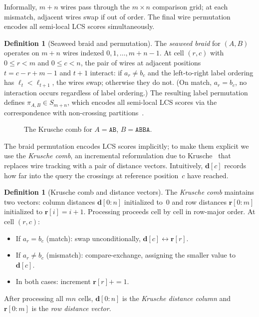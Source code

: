\documentclass[11pt, a4paper]{article}
\theoremstyle{definition}
\newtheorem{definition}[theorem]{Definition}
\theoremstyle{remark}
\newcommand{\dcol}{\mathbf{d}}
\newcommand{\drow}{\mathbf{r}}
\newcommand{\perm}{\pi}
\begin{document}
Informally, $m{+}n$ wires pass through the $m \times n$ comparison
grid; at each mismatch, adjacent wires swap if out of order.
The
final wire permutation encodes all semi-local LCS scores
simultaneously.

\begin{definition}[Seaweed braid and permutation]
\label{def:seaweed}
The \emph{seaweed braid} for $(A, B)$ operates on
$m{+}n$ wires indexed $0, 1, \dots, m{+}n{-}1$.
At cell
$(r, c)$ with $0 \le r < m$ and $0 \le c < n$, the pair of
wires at adjacent positions $t = c - r + m - 1$ and $t{+}1$
interact: if $a_r \ne b_c$ and the left-to-right label ordering
has $\ell_t < \ell_{t+1}$, the wires swap;
otherwise they do
not.  (On match, $a_r = b_c$, no interaction occurs regardless of
label ordering.)  The resulting label permutation defines
$\perm_{A,B} \in S_{m+n}$, which encodes all semi-local LCS
scores via the correspondence with non-crossing
partitions~\cite{tiskin2008semi}.
\end{definition}

\begin{figure}[!htbp]
\centering

\caption{The Krusche comb for $A = \texttt{AB}$, $B = \texttt{ABBA}$.}
\label{fig:krusche}
\end{figure}

The braid permutation encodes LCS scores implicitly;
to make them
explicit we use the \emph{Krusche comb}, an incremental
reformulation due to Krusche~\cite{krusche2010spaa} that replaces
wire tracking with a pair of distance vectors.
Intuitively,
$\dcol[c]$ records how far into the query the crossings at reference
position~$c$ have reached.

\begin{definition}[Krusche comb and distance vectors]
\label{def:krusche}
The \emph{Krusche comb} maintains two vectors: column distances
$\dcol[0{:}n]$ initialized to~$0$ and row distances
$\drow[0{:}m]$ initialized to $\drow[i] = i{+}1$.
Processing
proceeds cell by cell in row-major order.  At cell $(r, c)$:
\begin{itemize}
  \item If $a_r = b_c$ (match): swap unconditionally,
    $\dcol[c] \leftrightarrow \drow[r]$.
  \item If $a_r \ne b_c$ (mismatch): compare-exchange,
    assigning the smaller value to~$\dcol[c]$.
  \item In both cases: increment $\drow[r] \mathrel{{+}{=}} 1$.
\end{itemize}
After processing all $mn$ cells, $\dcol[0{:}n]$ is the
\emph{Krusche distance column} and $\drow[0{:}m]$ is the
\emph{row distance vector}.
\end{definition}
\end{document}

